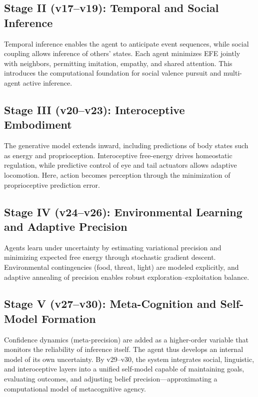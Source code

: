 \documentclass[9pt]{elife}
\begin{document}
\subsection{Stage II (v17–v19): Temporal and Social Inference}

Temporal inference enables the agent to anticipate event sequences, while social coupling allows inference of others’ states.  
Each agent minimizes EFE jointly with neighbors, permitting imitation, empathy, and shared attention.  
This introduces the computational foundation for social valence pursuit and multi-agent active inference.

\subsection{Stage III (v20–v23): Interoceptive Embodiment}

The generative model extends inward, including predictions of body states such as energy and proprioception.  
Interoceptive free-energy drives homeostatic regulation, while predictive control of eye and tail actuators allows adaptive locomotion.  
Here, action becomes perception through the minimization of proprioceptive prediction error.

\subsection{Stage IV (v24–v26): Environmental Learning and Adaptive Precision}

Agents learn under uncertainty by estimating variational precision and minimizing expected free energy through stochastic gradient descent.  
Environmental contingencies (food, threat, light) are modeled explicitly, and adaptive annealing of precision enables robust exploration–exploitation balance.

\subsection{Stage V (v27–v30): Meta-Cognition and Self-Model Formation}

Confidence dynamics (meta-precision) are added as a higher-order variable that monitors the reliability of inference itself.  
The agent thus develops an internal model of its own uncertainty.  
By v29–v30, the system integrates social, linguistic, and interoceptive layers into a unified self-model capable of maintaining goals, evaluating outcomes, and adjusting belief precision—approximating a computational model of metacognitive agency.
\end{document}
